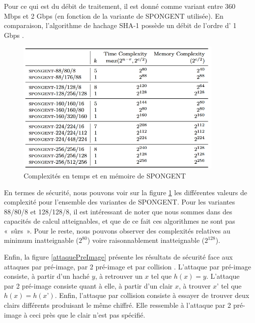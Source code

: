 			Pour ce qui est du débit de traitement, il est donné comme variant entre 360
		Mbps et 2 Gbps (en fonction de la variante de SPONGENT utilisée). En
		comparaison, l’algorithme de hachage SHA-1 possède un débit de l’ordre d’ 1
		Gbps \cite{SHA1}.

		\begin{figure}[!h]
			\centering
			\includegraphics[width=0.9\textwidth]{imgs/Spongent/timeComplexity.png}
			\caption{Complexités en temps et en mémoire de SPONGENT}
			\label{timeComplexity}
		\end{figure}

			En termes de sécurité, nous pouvons voir sur la figure \ref{timeComplexity}
		les différentes valeurs de complexité pour l’ensemble des variantes de
		SPONGENT. Pour les variantes 88/80/8 et 128/128/8, il est intéressant de
		noter que nous sommes dans des capacités de calcul atteignables, et que de
		ce fait ces algorithmes ne sont pas « sûrs ». Pour le reste, nous pouvons
		observer des complexités relatives au minimum inatteignable ($2^{80}$) voire
		raisonnablement inatteignable ($2^{128}$).

			Enfin, la figure \ref{attaquePreImage} présente les résultats de sécurité
		face aux attaques par pré-image, par 2 pré-image et par collision
		\cite{googleSpongent}. L’attaque par pré-image consiste, à partir d’un haché
		$y$, à retrouver un $x$ tel que $h(x) = y$. L’attaque par 2
		pré-image consiste quant à elle, à partir d’un clair $x$, à trouver $x’$ tel
		que $h(x) = h(x’)$. Enfin, l’attaque par collision consiste à essayer de
		trouver deux clairs différents produisant le même chiffré. Elle ressemble à
		l’attaque par 2 pré-image à ceci près que le clair n’est pas
		spécifié.

